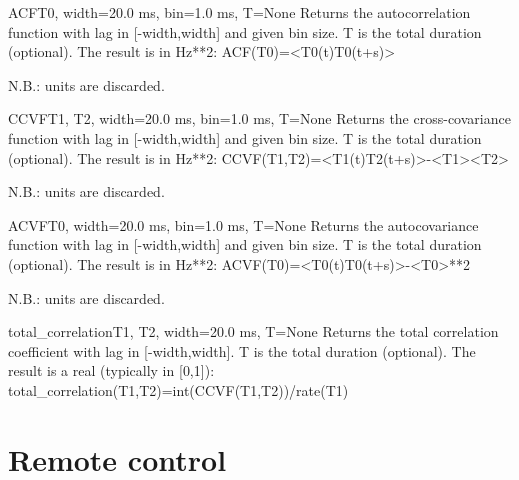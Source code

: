\documentclass[letterpaper,10pt,english]{manual}
\begin{document}
\hypertarget{brian.ACF}{}\begin{funcdesc}{ACF}{T0, width=20.0 ms, bin=1.0 ms, T=None}
Returns the autocorrelation function with lag in {[}-width,width{]} and given bin size.
T is the total duration (optional).
The result is in Hz**2:
ACF(T0)=\textless{}T0(t)T0(t+s)\textgreater{}

N.B.: units are discarded.
\end{funcdesc}

\hypertarget{brian.CCVF}{}\begin{funcdesc}{CCVF}{T1, T2, width=20.0 ms, bin=1.0 ms, T=None}
Returns the cross-covariance function with lag in {[}-width,width{]} and given bin size.
T is the total duration (optional).
The result is in Hz**2:
CCVF(T1,T2)=\textless{}T1(t)T2(t+s)\textgreater{}-\textless{}T1\textgreater{}\textless{}T2\textgreater{}

N.B.: units are discarded.
\end{funcdesc}

\hypertarget{brian.ACVF}{}\begin{funcdesc}{ACVF}{T0, width=20.0 ms, bin=1.0 ms, T=None}
Returns the autocovariance function with lag in {[}-width,width{]} and given bin size.
T is the total duration (optional).
The result is in Hz**2:
ACVF(T0)=\textless{}T0(t)T0(t+s)\textgreater{}-\textless{}T0\textgreater{}**2

N.B.: units are discarded.
\end{funcdesc}

\hypertarget{brian.total_correlation}{}\begin{funcdesc}{total\_correlation}{T1, T2, width=20.0 ms, T=None}
Returns the total correlation coefficient with lag in {[}-width,width{]}.
T is the total duration (optional).
The result is a real (typically in {[}0,1{]}):
total\_correlation(T1,T2)=int(CCVF(T1,T2))/rate(T1)
\end{funcdesc}

\resetcurrentobjects
\hypertarget{--doc-reference-remotecontrol}{}

\hypertarget{index-108}{}\section{Remote control}
\end{document}
